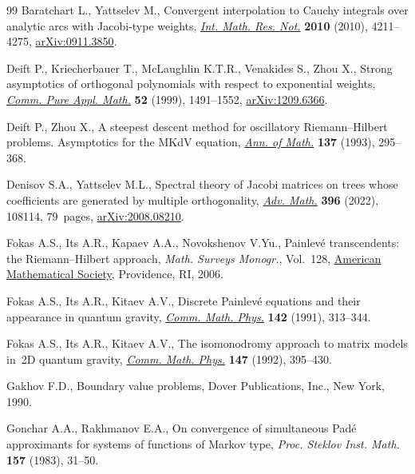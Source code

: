 \documentclass[pdftex]{sigma}
\numberwithin{equation}{section}
\begin{document}
\begin{thebibliography}{99}
Baratchart L., Yattselev M., Convergent interpolation to {C}auchy integrals
 over analytic arcs with {J}acobi-type weights,
 \href{https://doi.org/10.1093/imrn/rnq026}{\textit{Int. Math. Res. Not.}}
 \textbf{2010} (2010), 4211--4275, \href{http://arxiv.org/abs/0911.3850}{arXiv:0911.3850}.

Deift P., Kriecherbauer T., McLaughlin K.T.R., Venakides S., Zhou X., Strong
 asymptotics of orthogonal polynomials with respect to exponential weights,
 \href{https://doi.org/10.1002/(sici)1097-0312(199912)52:12&lt;1491::aid-cpa2&gt;3.0.co;2-#}{\textit{Comm.
 Pure Appl. Math.}} \textbf{52} (1999), 1491--1552, \href{http://arxiv.org/abs/1209.6366}{arXiv:1209.6366}.

Deift P., Zhou X., A steepest descent method for oscillatory
 {R}iemann--{H}ilbert problems. {A}symptotics for the {MK}d{V} equation,
 \href{https://doi.org/10.2307/2946540}{\textit{Ann. of Math.}} \textbf{137}
 (1993), 295--368.

Denisov S.A., Yattselev M.L., Spectral theory of {J}acobi matrices on trees
 whose coefficients are generated by multiple orthogonality,
 \href{https://doi.org/10.1016/j.aim.2021.108114}{\textit{Adv. Math.}}
 \textbf{396} (2022), 108114, 79~pages, \href{http://arxiv.org/abs/2008.08210}{arXiv:2008.08210}.

Fokas A.S., Its A.R., Kapaev A.A., Novokshenov V.Yu., Painlev\'e transcendents:
 the {R}iemann--{H}ilbert approach, \textit{Math. Surveys Monogr.}, Vol.~128,
 \href{https://doi.org/10.1090/surv/128}{American Mathematical Society},
 Providence, RI, 2006.

Fokas A.S., Its A.R., Kitaev A.V., Discrete {P}ainlev\'e equations and their
 appearance in quantum gravity,
 \href{https://doi.org/10.1007/BF02102066}{\textit{Comm. Math. Phys.}}
 \textbf{142} (1991), 313--344.

Fokas A.S., Its A.R., Kitaev A.V., The isomonodromy approach to matrix models
 in~2D quantum gravity,
 \href{https://doi.org/10.1007/BF02096594}{\textit{Comm. Math. Phys.}}
 \textbf{147} (1992), 395--430.

Gakhov F.D., Boundary value problems, Dover Publications, Inc., New York, 1990.

Gonchar A.A., Rakhmanov E.A., On convergence of simultaneous {P}ad\'e
 approximants for systems of functions of {M}arkov type, \textit{Proc. Steklov
 Inst. Math.} \textbf{157} (1983), 31--50.


\end{thebibliography}
\end{document}
